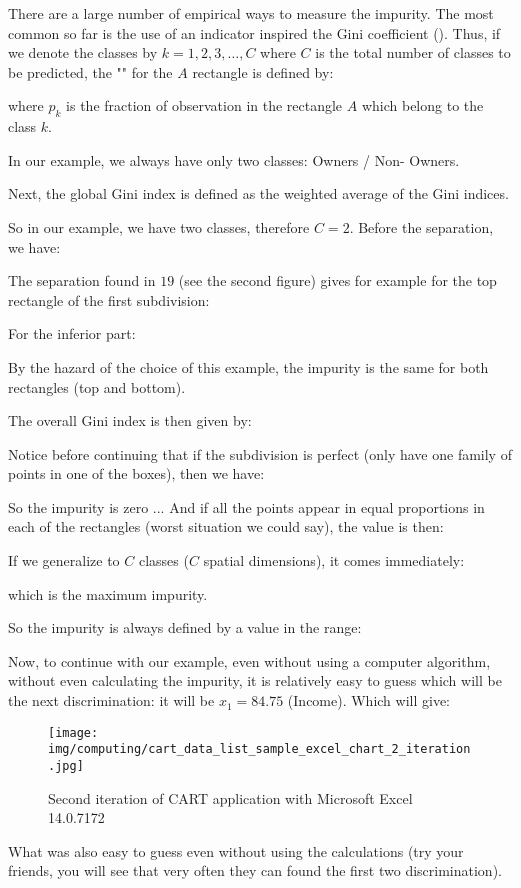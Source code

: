 	There are a large number of empirical ways to measure the impurity. The most common so far is the use of an indicator inspired the Gini coefficient (). Thus, if we denote the classes by $k=1,2,3,\ldots,C$ where $C$ is the total number of classes to be predicted, the "" for the $A$ rectangle is defined by:
	
	where $p_k$ is the fraction of observation in the rectangle $A$ which belong to the class $k$. 

	In our example, we always have only two classes: Owners / Non- Owners.

	Next, the global Gini index is defined as the weighted average of the Gini indices.

	So in our example, we have two classes, therefore $C=2$. Before the separation, we have:
	
	The separation found in $19$ (see the second figure) gives for example for the top rectangle of the first subdivision:
	
	For the inferior part:
	
	By the hazard of the choice of this example, the impurity is the same for both rectangles (top and bottom).

	The overall Gini index is then given by:
	
	Notice before continuing that if the subdivision is perfect (only have one family of points in one of the boxes), then we have:
	
	So the impurity is zero ... And if all the points appear in equal proportions in each of the rectangles (worst situation we could say), the value is then:
	
	If we generalize to $C$ classes ($C$ spatial dimensions), it comes immediately:
	
	which is the maximum impurity.

	So the impurity is always defined by a value in the range:
	
	Now, to continue with our example, even without using a computer algorithm, without even calculating the impurity, it is relatively easy to guess which will be the next discrimination: it will be $x_1=84.75$ (Income). Which will give:
	\begin{figure}[H]
		\centering
		\texttt{[image: img/computing/cart\_data\_list\_sample\_excel\_chart\_2\_iteration.jpg]}
		\caption[]{Second iteration of CART application with Microsoft Excel 14.0.7172}
	\end{figure}
	What was also easy to guess even without using the calculations (try your friends, you will see that very often they can found the first two discrimination).


